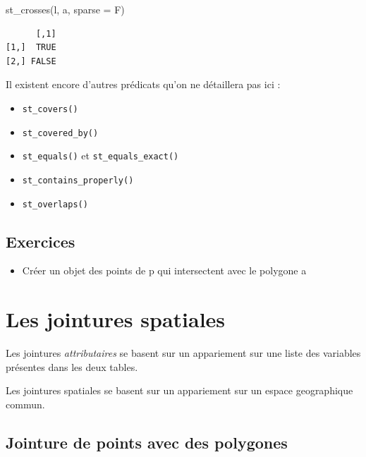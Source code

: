 \documentclass[
]{book}
\newenvironment{Shaded}{\begin{snugshade}}{\end{snugshade}}
\newcommand{\AttributeTok}[1]{\textcolor[rgb]{0.77,0.63,0.00}{#1}}
\newcommand{\FunctionTok}[1]{\textcolor[rgb]{0.00,0.00,0.00}{#1}}
\newcommand{\NormalTok}[1]{#1}
\providecommand{\tightlist}{%
  \setlength{\itemsep}{0pt}\setlength{\parskip}{0pt}}
\begin{document}
\begin{Shaded}
\begin{Highlighting}[]
\FunctionTok{st\_crosses}\NormalTok{(l, a, }\AttributeTok{sparse =}\NormalTok{ F)}
\end{Highlighting}
\end{Shaded}

\begin{verbatim}
      [,1]
[1,]  TRUE
[2,] FALSE
\end{verbatim}

Il existent encore d'autres prédicats qu'on ne détaillera pas ici :

\begin{itemize}
\item
  \texttt{st\_covers()}
\item
  \texttt{st\_covered\_by()}
\item
  \texttt{st\_equals()} et \texttt{st\_equals\_exact()}
\item
  \texttt{st\_contains\_properly()}
\item
  \texttt{st\_overlaps()}
\end{itemize}

\hypertarget{exercices}{%
\subsection{Exercices}\label{exercices}}

\begin{itemize}
\tightlist
\item
  Créer un objet des points de p qui intersectent avec le polygone a
\end{itemize}

\hypertarget{les-jointures-spatiales}{%
\section{Les jointures spatiales}\label{les-jointures-spatiales}}

Les jointures \emph{attributaires} se basent sur un appariement sur une liste des variables présentes dans les deux tables.

Les jointures spatiales se basent sur un appariement sur un espace geographique commun.

\hypertarget{jointure-de-points-avec-des-polygones}{%
\subsection{Jointure de points avec des polygones}\label{jointure-de-points-avec-des-polygones}}
\end{document}
